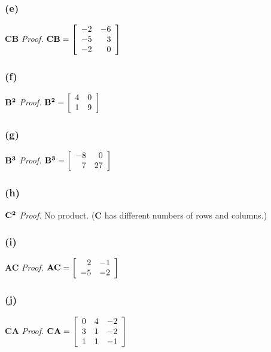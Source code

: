 \documentclass[14pt]{extarticle}
\begin{document}
\subsubsection{(e)}
{\bf CB}\hspace{3cm}
{\it Proof.}
\({\bf CB} = 
\left[ 
\begin{array}{rr}
-2 & -6 \\
-5 & 3 \\
-2 & 0 \\
\end{array}
\right]
\)

\subsubsection{(f)}
\({\bf B^2}\)\hspace{3cm}
{\it Proof.}
\({\bf B^2} = 
\left[ 
\begin{array}{rr}
4 & 0 \\
1 & 9 \\
\end{array}
\right]
\)

\subsubsection{(g)}
\({\bf B^3}\)\hspace{3cm}
{\it Proof.}
\({\bf B^3} = 
\left[ 
\begin{array}{rr}
-8 & 0 \\
7 & 27 \\
\end{array}
\right]
\)

\subsubsection{(h)}
\({\bf C^2}\)\hspace{3cm}
{\it Proof.} No product. ({\bf C} has different numbers of rows and columns.)

\subsubsection{(i)}
{\bf AC}\hspace{3cm}
{\it Proof.}
\({\bf AC} = 
\left[ 
\begin{array}{rr}
2 & -1 \\
-5 & -2 \\
\end{array}
\right]
\)

\subsubsection{(j)}
{\bf CA}\hspace{3cm}
{\it Proof.}
\({\bf CA} = 
\left[ 
\begin{array}{rrr}
0 & 4 & -2 \\
3 & 1 & -2\\
1 & 1 & -1 \\
\end{array}
\right]
\)
\end{document}
